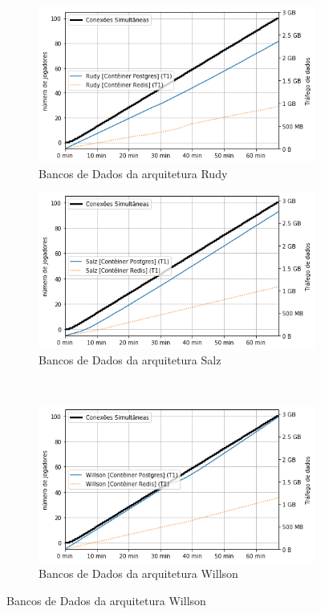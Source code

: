 \begin{figure}[htb!]
    \caption{Saída de dados da rede dos bancos de dados}
    \label{fig:experimento_db_net_out}

    \begin{subfigure}{0.5\textwidth}
        \centering
        \includegraphics[width=.95\linewidth]{figuras/analise/rt/r_net_out_db.png}
        \caption{Bancos de Dados da arquitetura Rudy}
        \label{fig:r_netout_db}
    \end{subfigure}%
    \begin{subfigure}{0.5\textwidth}
        \centering
        \includegraphics[width=.95\linewidth]{figuras/analise/rt/s_net_out_db.png}
        \caption{Bancos de Dados da arquitetura Salz}
        \label{fig:s_netout_db}
    \end{subfigure}\\

    \begin{subfigure}{0.5\textwidth}
        \centering
        \includegraphics[width=.95\linewidth]{figuras/analise/rt/w_net_out_db.png}
        \caption{Bancos de Dados da arquitetura Willson}
        \label{fig:w_netout_db}
    \end{subfigure}


\end{figure}
